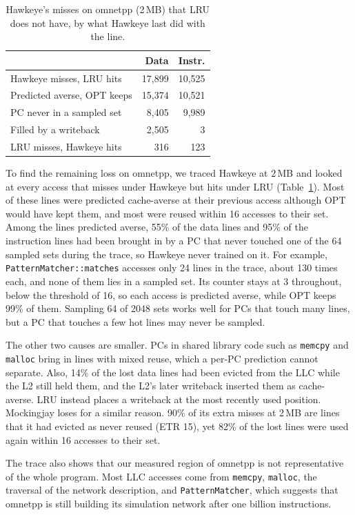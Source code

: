 \documentclass[11pt,conference]{IEEEtran}
\begin{document}
\begin{table}[t]
\centering
\caption{Hawkeye's misses on omnetpp (2\,MB) that LRU does not have, by what
Hawkeye last did with the line.}
\label{tab:omnetpp}
\setlength{\tabcolsep}{4pt}
\begin{tabular}{@{}lrr@{}}
\toprule
& Data & Instr. \\
\midrule
Hawkeye misses, LRU hits & 17,899 & 10,525 \\
\quad Predicted averse, OPT keeps & 15,374 & 10,521 \\
\qquad PC never in a sampled set & 8,405 & 9,989 \\
\quad Filled by a writeback & 2,505 & 3 \\
LRU misses, Hawkeye hits & 316 & 123 \\
\bottomrule
\end{tabular}
\end{table}

To find the remaining loss on omnetpp, we traced Hawkeye at 2\,MB and looked at
every access that misses under Hawkeye but hits under LRU
(Table~\ref{tab:omnetpp}). Most of these lines were predicted cache-averse at
their previous access although OPT would have kept them, and most were reused
within 16 accesses to their set. Among the
lines predicted averse, 55\% of the data lines and 95\% of the instruction
lines had been brought in by a PC that never touched one of the 64 sampled
sets during the trace, so Hawkeye never trained on it. For example, \texttt{PatternMatcher::matches} accesses
only 24 lines in the trace, about 130 times each, and none of them lies in a
sampled set. Its counter stays at 3 throughout, below the threshold of 16, so
each access is predicted averse, while OPT keeps 99\% of them. Sampling 64 of
2048 sets works well for PCs that touch many lines, but a PC that touches a few
hot lines may never be sampled.

The other two causes are smaller. PCs in shared library code such as
\texttt{memcpy} and \texttt{malloc} bring in lines with mixed reuse, which a
per-PC prediction cannot separate. Also, 14\% of the lost data lines had been
evicted from the LLC while the L2 still held them, and the L2's later writeback
inserted them as cache-averse. LRU instead places a writeback at the most
recently used position. Mockingjay loses for a similar reason. 90\% of its
extra misses at 2\,MB are lines that it had evicted as never reused (ETR 15),
yet 82\% of the lost lines were used again within 16 accesses to their set.

The trace also shows that our measured region of omnetpp is not
representative of the whole program. Most LLC accesses come from
\texttt{memcpy}, \texttt{malloc}, the traversal of the network description, and
\texttt{PatternMatcher}, which suggests that omnetpp is still building its
simulation network after one billion instructions.
\end{document}
